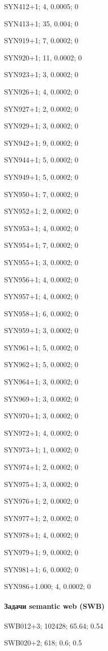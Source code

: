 SYN412+1; 4, 0.0005; 0

SYN413+1; 35, 0.004; 0

SYN919+1; 7, 0.0002; 0

SYN920+1; 11, 0.0002; 0

SYN923+1; 3, 0.0002; 0

SYN926+1; 4, 0.0002; 0

SYN927+1; 2, 0.0002; 0

SYN929+1; 3, 0.0002; 0

SYN942+1; 9, 0.0002; 0

SYN944+1; 5, 0.0002; 0

SYN949+1; 5, 0.0002; 0

SYN950+1; 7, 0.0002; 0

SYN952+1; 2, 0.0002; 0

SYN953+1; 4, 0.0002; 0

SYN954+1; 7, 0.0002; 0

SYN955+1; 3, 0.0002; 0

SYN956+1; 4, 0.0002; 0

SYN957+1; 4, 0.0002; 0

SYN958+1; 6, 0.0002; 0

SYN959+1; 3, 0.0002; 0

SYN961+1; 5, 0.0002; 0

SYN962+1; 5, 0.0002; 0

SYN964+1; 3, 0.0002; 0

SYN969+1; 3, 0.0002; 0

SYN970+1; 3, 0.0002; 0

SYN972+1; 4, 0.0002; 0

SYN973+1; 1, 0.0002; 0

SYN974+1; 2, 0.0002; 0

SYN975+1; 3, 0.0002; 0

SYN976+1; 2, 0.0002; 0

SYN977+1; 2, 0.0002; 0

SYN978+1; 4, 0.0002; 0

SYN979+1; 9, 0.0002; 0

SYN981+1; 6, 0.0002; 0

SYN986+1.000; 4, 0.0002; 0

\paragraph{Задачи semantic web (SWB)}

SWB012+3; 102428; 65.64; 0.54

SWB020+2; 618; 0.6; 0.5

